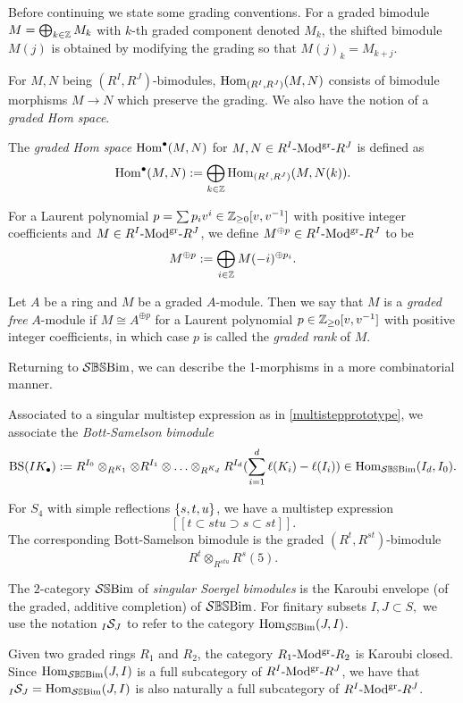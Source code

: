 Before continuing we state some grading conventions. For a graded bimodule $M=\bigoplus_{k \in \mathbb{Z}}M_k$ with $k$-th graded component denoted $M_k$, the shifted bimodule $M(j)$ is obtained by modifying the grading so that $M(j)_k=M_{k+j}$.

For $M,N$ being $(R^I, R^J)$-bimodules, $\operatorname{Hom}_{(R^I,R^J)}(M,N)$ consists of bimodule morphisms $M\rightarrow N$ which preserve the grading. 
We also have the notion of a \emph{graded Hom space}. 
\begin{defn}\label{defn- graded Hom}
   The \emph{graded Hom space} $\operatorname{Hom}^\bullet(M,N)$ for $M, N \in \text{${R^I}$-Mod$^{\text{gr}}$-${R^J}$}$ is defined as 
   $$\operatorname{Hom}^\bullet(M,N):=\bigoplus_{k\in \mathbb{Z}} \operatorname{Hom}_{(R^I,R^J)}(M,N(k)).$$
\end{defn}
For a Laurent polynomial $p=\sum p_iv^i \in \mathbb{Z}_{\geq0}[v,v^{-1}]$ with positive integer coefficients and $M \in \text{${R^I}$-Mod$^{\text{gr}}$-${R^J}$}$, we define $M^{\oplus p} \in \text{${R^I}$-Mod$^{\text{gr}}$-${R^J}$}$ to be
$$M^{\oplus p}:=\bigoplus_{i\in \mathbb{Z}}M(-i)^{\oplus p_i}.$$


\begin{defn}
    Let $A$ be a ring and $M$ be a graded $A$-module. Then we say that $M$ is a \emph{graded free} $A$-module if $M\cong A^{\oplus p}$ for a Laurent polynomial $p \in \mathbb{Z}_{\geq 0}[v,v^{-1}]$ with positive integer coefficients, in which case $p$ is called the \emph{graded rank} of $M.$
\end{defn}


Returning to $\mathcal{S}\mathbb{BS}\text{Bim}$, we can describe the 1-morphisms in a more combinatorial manner.

\begin{defn}
Associated to a singular multistep expression as in \eqref{multistepprototype}, we associate the \emph{Bott-Samelson bimodule}
$$\operatorname{BS}(IK_{\bullet}):= R^{I_0}\otimes_{R^{K_1}} \otimes R^{I_1}\otimes \ldots \otimes_{R^{K_d}}R^{I_d}(\sum_{i=1}^d \ell(K_i)-\ell(I_i)) \in \operatorname{Hom}_{\mathcal{S}\mathbb{BS}\text{Bim}}(I_d,I_0).$$
\end{defn}

\begin{example}
    For $S_4$ with simple reflections $\{s,t,u\}$, we have a multistep expression
    $$[[t \subset stu \supset s\subset st]].$$
    The corresponding Bott-Samelson bimodule is the graded $(R^t, R^{st})$-bimodule
    $$R^t \otimes_{R^{stu}}R^s(5).$$
\end{example}


\begin{defn} The $2$-category $\mathcal{S}\mathbb{S}\text{Bim}$ of \emph{singular Soergel bimodules} is the Karoubi envelope (of the graded, additive completion) of $\mathcal{S}\mathbb{BS}\text{Bim}$. For finitary subsets $I, J \subset S,$ we use the notation ${}_{I}\mathcal{S}_{J}$ to refer to the category $\operatorname{Hom}_{\mathcal{S}\mathbb{S}\text{Bim}}(J,I)$. 
\end{defn}
Given two graded rings $R_1$ and $R_2$, the category $\text{${R_1}$-Mod$^{\text{gr}}$-${R_2}$}$ is Karoubi closed. 
Since $\operatorname{Hom}_{\mathcal{S}\mathbb{BS}\text{Bim}}(J,I)$ is a full subcategory of $\text{${R^I}$-Mod$^{\text{gr}}$-${R^J}$}$, we have that ${}_{I}\mathcal{S}_{J}=\operatorname{Hom}_{\mathcal{S}\mathbb{S}\text{Bim}}(J,I)$ is also naturally a full subcategory of $\text{${R^I}$-Mod$^{\text{gr}}$-${R^J}$}$.

